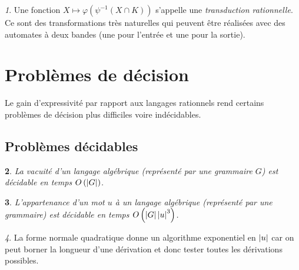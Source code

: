 \documentclass[11pt,a4paper]{article}
\theoremstyle{plain}
\newtheorem{thm}{\protect\theoremname}
\theoremstyle{definition}
\newtheorem{defn}[thm]{\protect\definitionname}
\theoremstyle{definition}
\theoremstyle{remark}
\theoremstyle{remark}
\newtheorem{rem}[thm]{\protect\remarkname}
\theoremstyle{plain}
\theoremstyle{plain}
\theoremstyle{plain}
\theoremstyle{remark}
\providecommand{\definitionname}{Définition}
\providecommand{\remarkname}{Remarque}
\providecommand{\theoremname}{Théorème}
\begin{document}
\begin{rem}
	Une fonction $X\mapsto\varphi\left(\psi^{-1}\left(X\cap K\right)\right)$
	s'appelle une \emph{transduction rationnelle}. Ce sont des transformations
	très naturelles qui peuvent être réalisées avec des automates à deux
	bandes (une pour l'entrée et une pour la sortie).
\end{rem}

%





\section{Problèmes de décision}

Le gain d'expressivité par rapport aux langages rationnels rend certains problèmes de décision plus difficiles voire indécidables.

\subsection{Problèmes décidables}

\begin{thm}
	La vacuité d'un langage algébrique (représenté par une grammaire $G$) est décidable en temps $O\left(\left|G\right|\right)$.
\end{thm}

\begin{thm} %
	L'appartenance d'un mot $u$ à un langage algébrique (représenté par une grammaire) est décidable en temps $O\left(\left|G\right|\left|u\right|^{3}\right)$.
\end{thm}

\begin{rem}
	La forme normale quadratique donne un algorithme exponentiel en $\left|u\right|$ car on peut borner la longueur d'une dérivation et donc tester toutes les dérivations possibles.
\end{rem}
\end{document}
